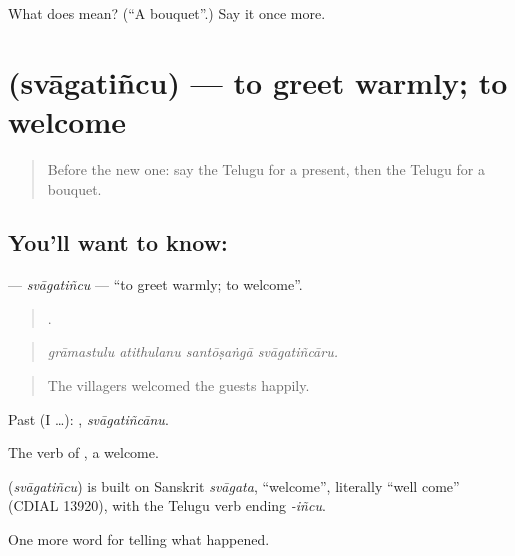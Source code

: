 \begin{tcolorbox}[breakable,colback=teal!4,colframe=teal!35!black,title={Before you move on}]
What does  mean? (\textquotedblleft{}A bouquet\textquotedblright{}.) Say it once more.
\end{tcolorbox}
\section[\texorpdfstring{\te{స్వాగతించు} (svāgatiñcu)}{స్వాగతించు (svāgatiñcu)}]{ (svāgatiñcu) — to greet warmly; to welcome}

\label{lesson:TE-C347-svagatincu}



\begin{quote}
Before the new one: say the Telugu for a present, then the Telugu for a bouquet.
\end{quote}

\subsection*{You'll want to know: }
\textbf{} — \emph{svāgatiñcu} — \textquotedblleft{}to greet warmly; to welcome\textquotedblright{}.

\begin{quote}
   .
\end{quote}

\begin{quote}
\emph{grāmastulu atithulanu santōṣaṅgā svāgatiñcāru.}
\end{quote}

\begin{quote}
The villagers welcomed the guests happily.
\end{quote}

Past (I …): , \emph{svāgatiñcānu}.

The verb of , a welcome.

\begin{cousinweb}
\textbf{} (\emph{svāgatiñcu}) is built on Sanskrit \emph{svāgata}, \textquotedblleft{}welcome\textquotedblright{}, literally \textquotedblleft{}well come\textquotedblright{} (CDIAL 13920), with the Telugu verb ending \emph{-iñcu}.
\end{cousinweb}

\begin{grammarlens}[title={What you've built}]
One more word for telling what happened.
\end{grammarlens}

